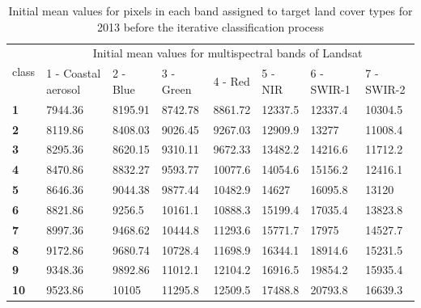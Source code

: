 \documentclass[jmse,article,submit,pdftex,moreauthors]{Definitions/mdpi}
\begin{document}
\begin{table}[H]
  \centering
  \begin{tabularx}{\textwidth}{p{0.7cm}p{2.5cm}p{1.0cm}p{1.3cm}p{1.0cm}p{1.0cm}p{1.5cm}p{1.5cm}}
  \toprule
  \multirow{2}{*}{class} & \multicolumn{7}{c}{Initial mean values for multispectral bands of Landsat} \\
     & 1 - Coastal aerosol & 2 - Blue & 3 - Green & 4 - Red & 5 - NIR & 6 - SWIR-1 & 7 - SWIR-2 \\
    \midrule
    \textbf{1} & 7944.36 & 8195.91 & 8742.78 & 8861.72 & 12337.5 & 12337.4 & 10304.5 \\
    \textbf{2} & 8119.86 & 8408.03 & 9026.45 & 9267.03 & 12909.9 & 13277 & 11008.4 \\
    \textbf{3} & 8295.36 & 8620.15 & 9310.11 & 9672.33 & 13482.2 & 14216.6 & 11712.2 \\
    \textbf{4} & 8470.86 & 8832.27 & 9593.77 & 10077.6 & 14054.6 & 15156.2 & 12416.1 \\
    \textbf{5} & 8646.36 & 9044.38 & 9877.44 & 10482.9 & 14627 & 16095.8 & 13120 \\
    \textbf{6} & 8821.86 & 9256.5 & 10161.1 & 10888.3 & 15199.4 &17035.4 & 13823.8  \\
    \textbf{7} & 8997.36 & 9468.62 & 10444.8 & 11293.6 & 15771.7 & 17975 & 14527.7 \\
    \textbf{8} & 9172.86 & 9680.74 & 10728.4 & 11698.9 & 16344.1 & 18914.6 & 15231.5 \\
    \textbf{9} & 9348.36 & 9892.86 & 11012.1 & 12104.2 & 16916.5 & 19854.2 & 15935.4 \\
    \textbf{10} & 9523.86 & 10105 & 11295.8 & 12509.5 & 17488.8 & 20793.8 & 16639.3 \\
\bottomrule
\end{tabularx}
  \caption{Initial mean values for pixels in each band assigned to target land cover types for 2013 before the iterative classification process}
  \label{tabA1} 
\end{table} 
\end{document}

